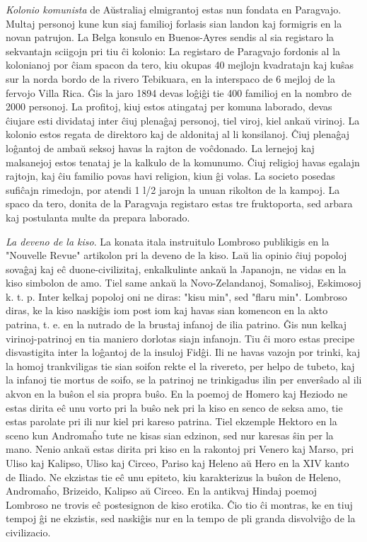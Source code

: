 \emph{Kolonio komunista} de A\u ustraliaj elmigrantoj estas nun
fondata en Paragvajo. Multaj personoj kune kun siaj familioj
forlasis sian landon kaj formigris en la novan patrujon. La Belga
konsulo en Buenos-Ayres sendis al sia registaro la sekvantajn
sciigojn pri tiu \^ci kolonio: La registaro de Paragvajo fordonis al
la kolonianoj por \^ciam spacon da tero, kiu okupas 40 mejlojn
kvadratajn kaj ku\^sas sur la norda bordo de la rivero Tebikuara, en
la interspaco de 6 mejloj de la fervojo Villa Rica. \^Gis la jaro
1894 devas lo\^gi\^gi tie 400 familioj en la nombro de 2000
personoj. La profitoj, kiuj estos atingataj per komuna laborado,
devas \^ciujare esti dividataj inter \^ciuj plena\^gaj personoj,
tiel viroj, kiel anka\u u virinoj. La kolonio estos regata de
direktoro kaj de aldonitaj al li konsilanoj. \^Ciuj plena\^gaj
lo\^gantoj de amba\u u seksoj havas la rajton de vo\^cdonado. La
lernejoj kaj malsanejoj estos tenataj je la kalkulo de la komunumo.
\^Ciuj religioj havas egalajn rajtojn, kaj \^ciu familio povas havi
religion, kiun \^gi volas. La societo posedas sufi\^cajn rimedojn,
por atendi 1 l/2 jarojn la unuan rikolton de la kampoj. La spaco da
tero, donita de la Paragvaja registaro estas tre fruktoporta, sed
arbara kaj postulanta multe da prepara laborado.

\emph{La deveno de la kiso}. La konata itala instruitulo Lombroso
publikigis en la "Nouvelle Revue" artikolon pri la deveno de la
kiso. La\u u lia opinio \^ciuj popoloj sova\^gaj kaj e\^c
duone-civilizitaj, enkalkulinte anka\u u la Japanojn, ne vidas en la
kiso simbolon de amo. Tiel same anka\u u la Novo-Zelandanoj,
Somalisoj, Eskimosoj k. t. p. Inter kelkaj popoloj oni ne diras:
"kisu min", sed "flaru min". Lombroso diras, ke la kiso
naski\^gis iom post iom kaj havas sian komencon en la akto patrina,
t. e. en la nutrado de la brustaj infanoj de ilia patrino. \^Gis nun
kelkaj virinoj-patrinoj en tia maniero dorlotas siajn infanojn. Tiu
\^ci moro estas precipe disvastigita inter la lo\^gantoj de la
insuloj Fid\^gi. Ili ne havas vazojn por trinki, kaj la homoj
trankviligas tie sian soifon rekte el la rivereto, per helpo de
tubeto, kaj la infanoj tie mortus de soifo, se la patrinoj ne
trinkigadus ilin per enver\^sado al ili akvon en la bu\^son el sia
propra bu\^so. En la poemoj de Homero kaj Heziodo ne estas dirita
e\^c unu vorto pri la bu\^so nek pri la kiso en senco de seksa amo,
tie estas parolate pri ili nur kiel pri kareso patrina. Tiel
ekzemple Hektoro en la sceno kun Androma\^ho tute ne kisas sian
edzinon, sed nur karesas \^sin per la mano. Nenio anka\u u estas
dirita pri kiso en la rakontoj pri Venero kaj Marso, pri Uliso kaj
Kalipso, Uliso kaj Circeo, Pariso kaj Heleno a\u u Hero en la XIV
kanto de Iliado. Ne ekzistas tie e\^c unu epiteto, kiu karakterizus
la bu\^son de Heleno, Androma\^ho, Brizeido, Kalipso a\u u Circeo.
En la antikvaj Hindaj poemoj Lombroso ne trovis e\^c postesignon de
kiso erotika. \^Cio tio \^ci montras, ke en tiuj tempoj \^gi ne
ekzistis, sed naski\^gis nur en la tempo de pli granda disvolvi\^go
de la civilizacio.

